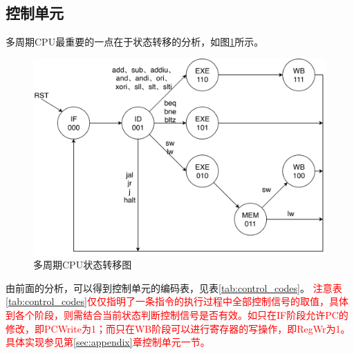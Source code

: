 
\subsection{控制单元}
\label{sub:control_unit}
\qquad 多周期CPU最重要的一点在于状态转移的分析，如图\ref{fig:state}所示。
\begin{figure}[H]
\centering
\includegraphics[width=0.65\linewidth]{fig/State.pdf}
\caption{多周期CPU状态转移图}
\label{fig:state}
\end{figure}
\par 由前面的分析，可以得到控制单元的编码表，见表\ref{tab:control_codes}。
\textcolor{red}{注意表\ref{tab:control_codes}仅仅指明了一条指令的执行过程中全部控制信号的取值，具体到各个阶段，则需结合当前状态判断控制信号是否有效。如只在IF阶段允许PC的修改，即PCWrite为1；而只在WB阶段可以进行寄存器的写操作，即RegWr为1。具体实现参见第\ref{sec:appendix}章控制单元一节。}
